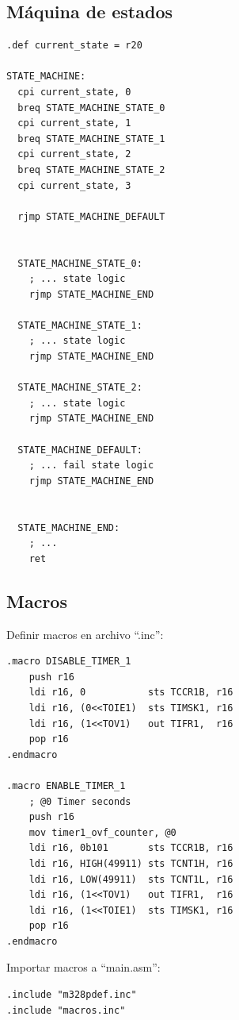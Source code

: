 \subsection{Máquina de estados}\label{anexo:Maquina_de_Estados}
\begin{verbatim}
.def current_state = r20

STATE_MACHINE:
  cpi current_state, 0
  breq STATE_MACHINE_STATE_0
  cpi current_state, 1
  breq STATE_MACHINE_STATE_1
  cpi current_state, 2
  breq STATE_MACHINE_STATE_2
  cpi current_state, 3

  rjmp STATE_MACHINE_DEFAULT
  

  STATE_MACHINE_STATE_0:
    ; ... state logic
    rjmp STATE_MACHINE_END

  STATE_MACHINE_STATE_1:
    ; ... state logic
    rjmp STATE_MACHINE_END

  STATE_MACHINE_STATE_2:
    ; ... state logic
    rjmp STATE_MACHINE_END

  STATE_MACHINE_DEFAULT:
    ; ... fail state logic
    rjmp STATE_MACHINE_END

  
  STATE_MACHINE_END:
    ; ...
    ret
\end{verbatim}

\subsection{Macros}\label{anexo:Macros}
Definir macros en archivo ``.inc'':

\begin{verbatim}
.macro DISABLE_TIMER_1
	push r16
	ldi r16, 0			 sts TCCR1B, r16
	ldi r16, (0<<TOIE1)	 sts TIMSK1, r16
	ldi r16, (1<<TOV1)   out TIFR1,  r16 
	pop r16
.endmacro

.macro ENABLE_TIMER_1
	; @0 Timer seconds
	push r16
	mov timer1_ovf_counter, @0
	ldi r16, 0b101		 sts TCCR1B, r16
	ldi r16, HIGH(49911) sts TCNT1H, r16
	ldi r16, LOW(49911)	 sts TCNT1L, r16 
	ldi r16, (1<<TOV1)   out TIFR1,  r16 
	ldi r16, (1<<TOIE1)  sts TIMSK1, r16 
	pop r16
.endmacro
\end{verbatim}

Importar macros a ``main.asm'':

\begin{verbatim}
.include "m328pdef.inc"
.include "macros.inc"
\end{verbatim}

